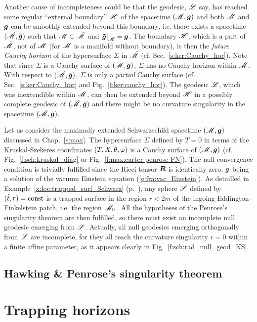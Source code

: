Another cause of incompleteness could be
that the geodesic, $\mathscr{L}$ say, has reached some regular ``external boundary'' $\mathscr{H}$
of the spacetime $(\mathscr{M},\bm{g})$
and both $\mathscr{M}$ and $\bm{g}$ can be smoothly extended beyond this boundary, i.e.
there exists a spacetime $(\tilde{\mathscr{M}}, \bm{\tilde{g}})$ such that $\mathscr{M} \subset \tilde{\mathscr{M}}$
and $\left. \bm{\tilde{g}} \right| _{\mathscr{M}} = \bm{g}$. The boundary $\mathscr{H}$, which is a part of
$\tilde{\mathscr{M}}$, not of $\mathscr{M}$ (for $\mathscr{M}$ is a manifold without boundary), is then the
\emph{future Cauchy horizon}  of the hypersurface $\Sigma$
in $\tilde{\mathscr{M}}$ (cf. Sec.~\ref{s:ker:Cauchy_hor}).
Note that since $\Sigma$ is a Cauchy surface of $(\mathscr{M},\bm{g})$,
$\Sigma$ has no Cauchy horizon within $\mathscr{M}$. With respect to $(\tilde{\mathscr{M}}, \bm{\tilde{g}})$,
$\Sigma$ is only a \emph{partial} Cauchy surface (cf. Sec.~\ref{s:ker:Cauchy_hor}
and Fig.~\ref{f:ker:cauchy_hor}).
The geodesic $\mathscr{L}$, which was inextendible within $\mathscr{M}$, can then be extended beyond
$\mathscr{H}$ in a possibly complete geodesic of $(\tilde{\mathscr{M}},\bm{\tilde{g}})$ and
there might be no curvature singularity in the spacetime $(\tilde{\mathscr{M}},\bm{\tilde{g}})$.

\begin{example}
Let us consider the maximally extended Schwarzschild spacetime $(\mathscr{M},\bm{g})$
discussed in Chap.~\ref{s:max}.
The hypersurface $\Sigma$ defined by $T=0$ in terms of the Kruskal-Szekeres coordinates
$(T,X,\theta,\varphi)$ is a Cauchy surface of $(\mathscr{M},\bm{g})$ (cf. Fig.~\ref{f:sch:kruskal_diag}
or Fig.~\ref{f:max:carter-penrose-FN}).
The null convergence condition
is trivially fulfilled since the Ricci tensor $\bm{R}$
is identically zero, $\bm{g}$ being a solution of the vacuum Einstein equation
(\ref{e:fra:vac_Einstein}). As detailled in Example~\ref{x:loc:trapped_surf_Schwarz}
(p.~\pageref{x:loc:trapped_surf_Schwarz}), any sphere $\mathscr{S}$ defined
by $({\tilde t},r) = \mathrm{const}$ is a trapped surface in the region $r<2 m$
of the ingoing Eddington-Finkelstein patch, i.e. the region $\mathscr{M}_{\rm II}$.
All the hypotheses of the Penrose's singularity theorem are then fulfilled,
so there must exist an incomplete null geodesic emerging from $\mathscr{S}$.
Actually, all null geodesics emerging orthogonally from $\mathscr{S}$ are incomplete,
for they all reach the curvature singularity $r=0$ within a finite affine
parameter, as it appears clearly in Fig.~\ref{f:sch:rad_null_geod_KS}.
\end{example}

\subsection{Hawking \& Penrose's singularity theorem}



\section{Trapping horizons}


